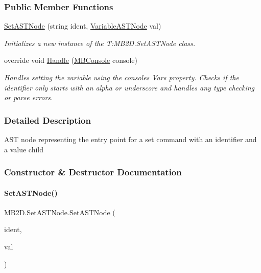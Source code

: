 \subsubsection*{Public Member Functions}
\begin{DoxyCompactItemize}
\item 
\hyperlink{class_m_b2_d_1_1_set_a_s_t_node_a1c4e7b10e1e9187e692f3dbea9a99887}{Set\+A\+S\+T\+Node} (string ident, \hyperlink{class_m_b2_d_1_1_variable_a_s_t_node}{Variable\+A\+S\+T\+Node} val)
\begin{DoxyCompactList}\small\item\em Initializes a new instance of the T\+:\+M\+B2\+D.\+Set\+A\+S\+T\+Node class. \end{DoxyCompactList}\item 
override void \hyperlink{class_m_b2_d_1_1_set_a_s_t_node_a54eba248a545f6182c6a5509c4c1a6f2}{Handle} (\hyperlink{class_m_b2_d_1_1_m_b_console}{M\+B\+Console} console)
\begin{DoxyCompactList}\small\item\em Handles setting the variable using the consoles Vars property. Checks if the identifier only starts with an alpha or underscore and handles any type checking or parse errors. \end{DoxyCompactList}\end{DoxyCompactItemize}


\subsubsection{Detailed Description}
A\+ST node representing the entry point for a \textquotesingle{}set\textquotesingle{} command with an identifier and a value child 



\subsubsection{Constructor \& Destructor Documentation}
\hypertarget{class_m_b2_d_1_1_set_a_s_t_node_a1c4e7b10e1e9187e692f3dbea9a99887}{}\label{class_m_b2_d_1_1_set_a_s_t_node_a1c4e7b10e1e9187e692f3dbea9a99887} 
\paragraph{\texorpdfstring{Set\+A\+S\+T\+Node()}{SetASTNode()}}
{\footnotesize\ttfamily M\+B2\+D.\+Set\+A\+S\+T\+Node.\+Set\+A\+S\+T\+Node (\begin{DoxyParamCaption}\item[{string}]{ident,  }\item[{\hyperlink{class_m_b2_d_1_1_variable_a_s_t_node}{Variable\+A\+S\+T\+Node}}]{val }\end{DoxyParamCaption})\hspace{0.3cm}{\ttfamily [inline]}}



